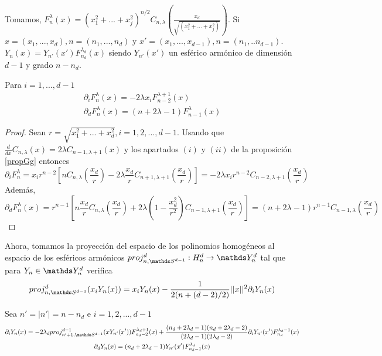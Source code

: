 Tomamos, $F_n^\lambda (x) = (x_1^2+...+x_j^2)^{n/2}C_{n,\lambda}(\frac{x_d}{\sqrt{(x_1^2+...+x_j^2)}})$.
Si $x=(x_1,...,x_d), n=(n_1,...,n_d)$ y $x' = (x_1,...,x_{d-1}), n=(n_1,..n_{d-1})$.
$Y_n(x) = Y_{n'}(x') F_{n_d}^{\lambda_d} (x)$ siendo $ Y_{n'}(x')$ un esférico armónico de dimensión $d-1$ y grado $n-n_d$.
\begin{prop}Para $i=1,...,d-1$
	\begin{gather*}
	\partial_i  F_{n}^\lambda(x) = -2\lambda x_i F_{n-2}^{\lambda+1}(x) \\ 
	\partial_d F_{n}^{\lambda}(x) = (n+2\lambda-1)  F_{n-1}^{\lambda}(x)
	\end{gather*}
\end{prop}
\begin{proof}
	Sean $r=\sqrt{x_1^2+...+x_d^2},i=1,2,...,d-1$. Usando que $\frac{d}{dx}C_{n,\lambda}(x) = 2\lambda C_{n-1,\lambda+1}(x)$ y los apartados $(i)$ y $(ii)$ de la proposición \hyperref[]{\ref{propGg}} entonces
	$$
	\partial_i F_{n}^{\lambda} = x_i r^{n-2} \left[ n C_{n,\lambda}(\frac{x_d}{r})-2\lambda\frac{x_d}{r}C_{n+1,\lambda+1}(\frac{x_d}{r})\right] = -2\lambda x_ir^{n-2}C_{n-2,\lambda+1}(\frac{x_d}{r})
	$$
	Además, $$
	\partial_d F_{n}^{\lambda}(x) = r^{n-1}\left[n\frac{x_d}{r}C_{n,\lambda}(\frac{x_d}{r})+2\lambda(1-\frac{x_d^2}{r^2})C_{n-1,\lambda+1}(\frac{x_d}{r})\right] = (n+2\lambda-1)r^{n-1}C_{n-1,\lambda}(\frac{x_d}{r})
	$$
\end{proof}
Ahora, tomamos la proyección del espacio de los polinomios homogéneos al espacio de los esféricos armónicos $proj_{n,\sphere}^d : H_n^d \to \spharm$ tal que para $Y_n\in\spharm$ verifica $$
proj_{n,\sphere}^d (x_iY_{n}(x)) = x_i Y_n(x)-\frac{1}{2(n+(d-2)/2)} ||x||^2 \partial_i Y_n(x)$$
\begin{prop}Sea $n'=|n'|=n-n_d$ e $i=1,2,...,d-1$
	\begin{gather*}
	\partial_i Y_n(x) = -2\lambda_d proj_{n'+1,\sphere}^{d-1}(xY_{n'}(x'))F_{n_d-2}^{\lambda_d+1}(x)+\frac{(n_d+2\lambda_d-1)(n_d+2\lambda_d-2)}{(2\lambda_d-1)(2\lambda_d-2)}\partial_iY_{n'}(x')F_{n_d}^{\lambda_d-1}(x) \\
	\partial_dY_n(x) = (n_d+2\lambda_d-1)Y_{n'}(x')F_{n_d-1}^{\lambda_d}(x)
	\end{gather*}
\end{prop}
